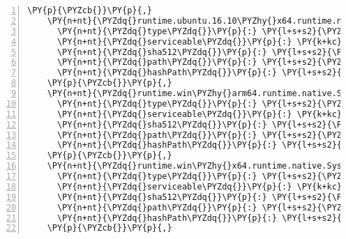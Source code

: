 \begin{Verbatim}[commandchars=\\\{\},numbers=left,firstnumber=1,stepnumber=1,numberblanklines=0]
    \PY{p}{\PYZcb{}}\PY{p}{,}
    \PY{n+nt}{\PYZdq{}runtime.ubuntu.16.10\PYZhy{}x64.runtime.native.System.Security.Cryptography.OpenSsl/4.3.0\PYZdq{}}\PY{p}{:} \PY{p}{\PYZob{}}
      \PY{n+nt}{\PYZdq{}type\PYZdq{}}\PY{p}{:} \PY{l+s+s2}{\PYZdq{}package\PYZdq{}}\PY{p}{,}
      \PY{n+nt}{\PYZdq{}serviceable\PYZdq{}}\PY{p}{:} \PY{k+kc}{true}\PY{p}{,}
      \PY{n+nt}{\PYZdq{}sha512\PYZdq{}}\PY{p}{:} \PY{l+s+s2}{\PYZdq{}sha512\PYZhy{}VB5cn/7OzUfzdnC8tqAIMQciVLiq2epm2NrAm1E9OjNRyG4lVhfR61SMcLizejzQP8R8Uf/0l5qOIbUEi+RdEg==\PYZdq{}}\PY{p}{,}
      \PY{n+nt}{\PYZdq{}path\PYZdq{}}\PY{p}{:} \PY{l+s+s2}{\PYZdq{}runtime.ubuntu.16.10\PYZhy{}x64.runtime.native.system.security.cryptography.openssl/4.3.0\PYZdq{}}\PY{p}{,}
      \PY{n+nt}{\PYZdq{}hashPath\PYZdq{}}\PY{p}{:} \PY{l+s+s2}{\PYZdq{}runtime.ubuntu.16.10\PYZhy{}x64.runtime.native.system.security.cryptography.openssl.4.3.0.nupkg.sha512\PYZdq{}}
    \PY{p}{\PYZcb{}}\PY{p}{,}
    \PY{n+nt}{\PYZdq{}runtime.win\PYZhy{}arm64.runtime.native.System.Data.SqlClient.sni/4.4.0\PYZdq{}}\PY{p}{:} \PY{p}{\PYZob{}}
      \PY{n+nt}{\PYZdq{}type\PYZdq{}}\PY{p}{:} \PY{l+s+s2}{\PYZdq{}package\PYZdq{}}\PY{p}{,}
      \PY{n+nt}{\PYZdq{}serviceable\PYZdq{}}\PY{p}{:} \PY{k+kc}{true}\PY{p}{,}
      \PY{n+nt}{\PYZdq{}sha512\PYZdq{}}\PY{p}{:} \PY{l+s+s2}{\PYZdq{}sha512\PYZhy{}LbrynESTp3bm5O/+jGL8v0Qg5SJlTV08lpIpFesXjF6uGNMWqFnUQbYBJwZTeua6E/Y7FIM1C54Ey1btLWupdg==\PYZdq{}}\PY{p}{,}
      \PY{n+nt}{\PYZdq{}path\PYZdq{}}\PY{p}{:} \PY{l+s+s2}{\PYZdq{}runtime.win\PYZhy{}arm64.runtime.native.system.data.sqlclient.sni/4.4.0\PYZdq{}}\PY{p}{,}
      \PY{n+nt}{\PYZdq{}hashPath\PYZdq{}}\PY{p}{:} \PY{l+s+s2}{\PYZdq{}runtime.win\PYZhy{}arm64.runtime.native.system.data.sqlclient.sni.4.4.0.nupkg.sha512\PYZdq{}}
    \PY{p}{\PYZcb{}}\PY{p}{,}
    \PY{n+nt}{\PYZdq{}runtime.win\PYZhy{}x64.runtime.native.System.Data.SqlClient.sni/4.4.0\PYZdq{}}\PY{p}{:} \PY{p}{\PYZob{}}
      \PY{n+nt}{\PYZdq{}type\PYZdq{}}\PY{p}{:} \PY{l+s+s2}{\PYZdq{}package\PYZdq{}}\PY{p}{,}
      \PY{n+nt}{\PYZdq{}serviceable\PYZdq{}}\PY{p}{:} \PY{k+kc}{true}\PY{p}{,}
      \PY{n+nt}{\PYZdq{}sha512\PYZdq{}}\PY{p}{:} \PY{l+s+s2}{\PYZdq{}sha512\PYZhy{}38ugOfkYJqJoX9g6EYRlZB5U2ZJH51UP8ptxZgdpS07FgOEToV+lS11ouNK2PM12Pr6X/PpT5jK82G3DwH/SxQ==\PYZdq{}}\PY{p}{,}
      \PY{n+nt}{\PYZdq{}path\PYZdq{}}\PY{p}{:} \PY{l+s+s2}{\PYZdq{}runtime.win\PYZhy{}x64.runtime.native.system.data.sqlclient.sni/4.4.0\PYZdq{}}\PY{p}{,}
      \PY{n+nt}{\PYZdq{}hashPath\PYZdq{}}\PY{p}{:} \PY{l+s+s2}{\PYZdq{}runtime.win\PYZhy{}x64.runtime.native.system.data.sqlclient.sni.4.4.0.nupkg.sha512\PYZdq{}}
    \PY{p}{\PYZcb{}}\PY{p}{,}

\end{Verbatim}
